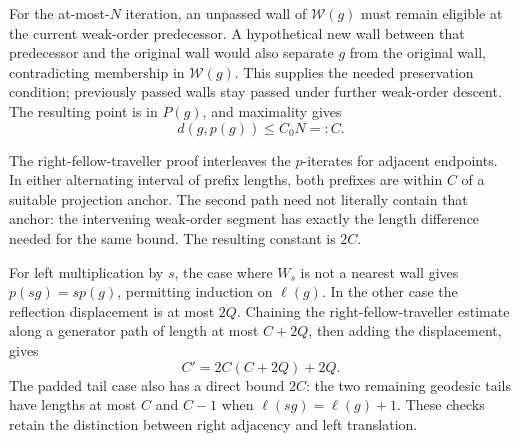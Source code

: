 \documentclass[10pt]{article}
\begin{document}
For the at-most-\(N\) iteration, an unpassed wall of \(\mathcal W(g)\) must remain eligible at the current weak-order predecessor. A hypothetical new wall between that predecessor and the original wall would also separate \(g\) from the original wall, contradicting membership in \(\mathcal W(g)\). This supplies the needed preservation condition; previously passed walls stay passed under further weak-order descent. The resulting point is in \(P(g)\), and maximality gives \[d(g,p(g))\le C_0N=:C.\]\par
The right-fellow-traveller proof interleaves the \(p\)-iterates for adjacent endpoints. In either alternating interval of prefix lengths, both prefixes are within \(C\) of a suitable projection anchor. The second path need not literally contain that anchor: the intervening weak-order segment has exactly the length difference needed for the same bound. The resulting constant is \(2C\).\par
For left multiplication by \(s\), the case where \(W_s\) is not a nearest wall gives \(p(sg)=sp(g)\), permitting induction on \(\ell(g)\). In the other case the reflection displacement is at most \(2Q\). Chaining the right-fellow-traveller estimate along a generator path of length at most \(C+2Q\), then adding the displacement, gives \[C'=2C(C+2Q)+2Q .\] The padded tail case also has a direct bound \(2C\): the two remaining geodesic tails have lengths at most \(C\) and \(C-1\) when \(\ell(sg)=\ell(g)+1\). These checks retain the distinction between right adjacency and left translation.\par
\end{document}
